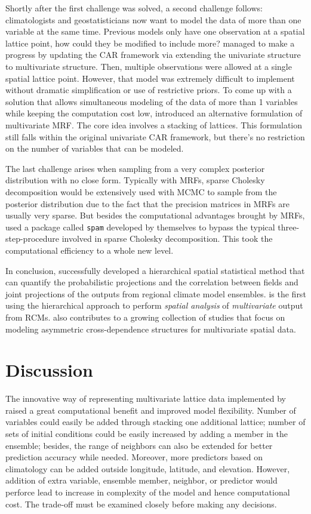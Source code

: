 \documentclass{article}
\begin{document}
Shortly after the first challenge was solved, a second challenge follows: climatologists and geostatisticians now want to model the data of more than one variable at the same time. Previous models only have one observation at a spatial lattice point, how could they be modified to include more? \cite{mardia} managed to make a progress by updating the CAR framework via extending the univariate structure to multivariate structure. Then, multiple observations were allowed at a single spatial lattice point. However, that model was extremely difficult to implement without dramatic simplification or use of restrictive priors. To come up with a solution that allows simultaneous modeling of the data of more than 1 variables while keeping the computation cost low, \cite{paper} introduced an alternative formulation of multivariate MRF. The core idea involves a stacking of lattices. This formulation still falls within the original univariate CAR framework, but there's no restriction on the number of variables that can be modeled. 

The last challenge arises when sampling from a very complex posterior distribution with no close form. Typically with MRFs, sparse Cholesky decomposition would be extensively used with MCMC to sample from the posterior distribution due to the fact that the precision matrices in MRFs are usually very sparse. But besides the computational advantages brought by MRFs, \cite{paper} used a package called \texttt{spam} developed by themselves to bypass the typical three-step-procedure involved in sparse Cholesky decomposition. This took the computational efficiency to a whole new level. 

In conclusion, \cite{paper} successfully developed a hierarchical spatial statistical method that can quantify the probabilistic projections and the correlation between fields and joint projections of the outputs from regional climate model ensembles. \cite{paper} is the first using the hierarchical approach to perform \emph{spatial analysis} of \emph{multivariate} output from RCMs. \cite{paper} also contributes to a growing collection of studies that focus on modeling asymmetric cross-dependence structures for multivariate spatial data.

\section{Discussion}
The innovative way of representing multivariate lattice data implemented by \cite{paper} raised a great computational benefit and improved model flexibility. Number of variables could easily be added through stacking one additional lattice; number of sets of initial conditions could be easily increased by adding a member in the ensemble; besides, the range of neighbors can also be extended for better prediction accuracy while needed. Moreover, more predictors based on climatology can be added outside longitude, latitude, and elevation. However, addition of extra variable, ensemble member, neighbor, or predictor would perforce lead to increase in complexity of the model and hence computational cost. The trade-off must be examined closely before making any decisions. 
\end{document}
